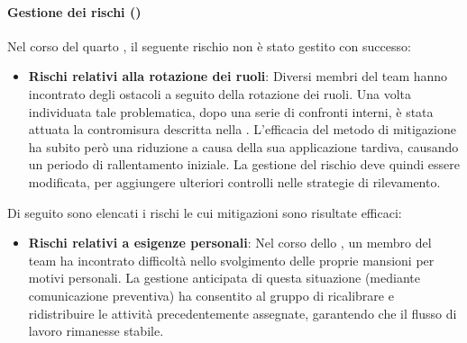 \paragraph*{Gestione dei rischi ()}
\par Nel corso del quarto , il seguente rischio non è stato gestito con successo:
\begin{itemize}
  \item \textbf{Rischi relativi alla rotazione dei ruoli}: Diversi membri del team hanno incontrato degli ostacoli a seguito della rotazione dei ruoli. Una volta individuata tale problematica, dopo una serie di confronti interni, è stata attuata la contromisura descritta nella . L'efficacia del metodo di mitigazione ha subito però una riduzione a causa della sua applicazione tardiva, causando un periodo di rallentamento iniziale. La gestione del rischio deve quindi essere modificata, per aggiungere ulteriori controlli nelle strategie di rilevamento.
\end{itemize}

\vspace{0.5\baselineskip}
\par Di seguito sono elencati i rischi le cui mitigazioni sono risultate efficaci:
\begin{itemize}
  \item \textbf{Rischi relativi a esigenze personali}: Nel corso dello , un membro del team ha incontrato difficoltà nello svolgimento delle proprie mansioni per motivi personali. La gestione anticipata di questa situazione (mediante comunicazione preventiva) ha consentito al gruppo di ricalibrare e ridistribuire le attività precedentemente assegnate, garantendo che il flusso di lavoro rimanesse stabile.
\end{itemize}
